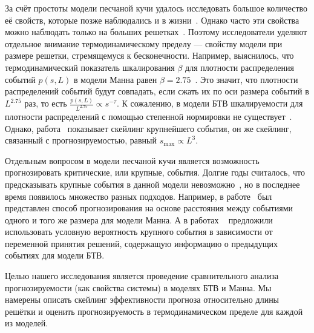 За счёт простоты модели песчаной кучи удалось исследовать большое количество её свойств, которые позже наблюдались и в жизни~\cite{Held1990,Jaeger1989}. Однако часто эти свойства можно наблюдать только на больших решетках~\cite{Liu1991}. Поэтому исследователи уделяют отдельное внимание термодинамическому пределу --- свойству модели при размере решетки, стремящемуся к бесконечности. Например, выяснилось, что термодинамический показатель шкалирования $\beta$ для плотности распределения событий $p(s, L)$ в модели Манна равен $\beta=2.75$~\cite{Dhar2006,manna,Vespignani2000AbsorbingstatePT}. Это значит, что  плотности распределений событий будут совпадать, если сжать их по оси размера событий в $L^{2.75}$ раз, то есть $\frac{p(s, L)}{L^{2.75}} \propto s^{-\tau}$. К сожалению, в модели БТВ шкалируемости для плотности распределений с помощью степенной нормировки не существует~\cite{Tebaldi1999MultifractalSI}. Однако, работа~\cite{Garber2009} показывает скейлинг крупнейшего события, он же скейлинг, связанный с прогнозируемостью, равный $s_{\max} \propto L^3$.

Отдельным вопросом в модели песчаной кучи является возможность прогнозировать критические, или крупные, события. Долгие годы считалось, что предсказывать крупные события в данной модели невозможно~\cite{Geller1997,Milovanov2021,Wyss1997}, но в последнее время появилось множество разных подходов. Например, в работе~\cite{deluca} был представлен способ прогнозирования на основе расстояния между событиями одного и того же размера для модели Манна. А в работах ~\cite{Hallerberg2009,Kantz2010} предложили использовать условную вероятность крупного события в зависимости от переменной принятия решений, содержащую информацию о предыдущих событиях для модели БТВ.

Целью нашего исследования является проведение сравнительного анализа прогнозируемости (как свойства системы) в моделях БТВ и Манна. Мы намерены описать скейлинг эффективности прогноза относительно длины решётки и оценить прогнозируемость в термодинамическом пределе для каждой из моделей.
